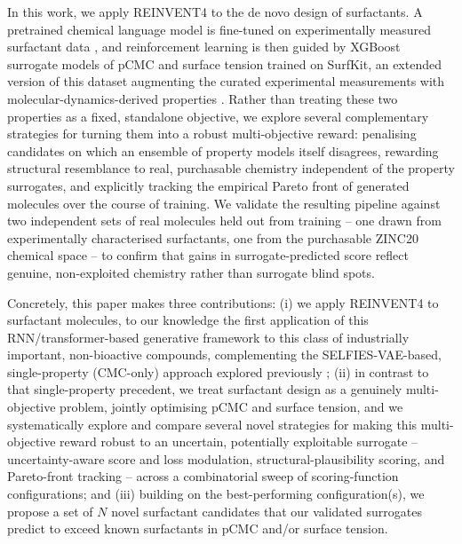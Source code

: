 \documentclass[11pt]{aime}
\begin{document}
In this work, we apply REINVENT4 \cite{loeffler_reinvent_2024} to the de novo design of surfactants. A pretrained chemical language model is fine-tuned on experimentally measured surfactant data \cite{hodl_surfpro_2025}, and reinforcement learning is then guided by XGBoost \cite{chen_xgboost_2016} surrogate models of pCMC and surface tension trained on SurfKit, an extended version of this dataset augmenting the curated experimental measurements with molecular-dynamics-derived properties \cite{beckmann_surfkit_2026}. Rather than treating these two properties as a fixed, standalone objective, we explore several complementary strategies for turning them into a robust multi-objective reward: penalising candidates on which an ensemble of property models itself disagrees, rewarding structural resemblance to real, purchasable chemistry independent of the property surrogates, and explicitly tracking the empirical Pareto front of generated molecules over the course of training. We validate the resulting pipeline against two independent sets of real molecules held out from training -- one drawn from experimentally characterised surfactants, one from the purchasable ZINC20 chemical space \cite{irwin_zinc20_2020} -- to confirm that gains in surrogate-predicted score reflect genuine, non-exploited chemistry rather than surrogate blind spots.

Concretely, this paper makes three contributions: (i) we apply REINVENT4 to surfactant molecules, to our knowledge the first application of this RNN/transformer-based generative framework to this class of industrially important, non-bioactive compounds, complementing the SELFIES-VAE-based, single-property (CMC-only) approach explored previously \cite{nnadili_surfactant-specific_2024}; (ii) in contrast to that single-property precedent, we treat surfactant design as a genuinely multi-objective problem, jointly optimising pCMC and surface tension, and we systematically explore and compare several novel strategies for making this multi-objective reward robust to an uncertain, potentially exploitable surrogate -- uncertainty-aware score and loss modulation, structural-plausibility scoring, and Pareto-front tracking -- across a combinatorial sweep of scoring-function configurations; and (iii) building on the best-performing configuration(s), we propose a set of $N$ novel surfactant candidates that our validated surrogates predict to exceed known surfactants in pCMC and/or surface tension.

\end{document}
